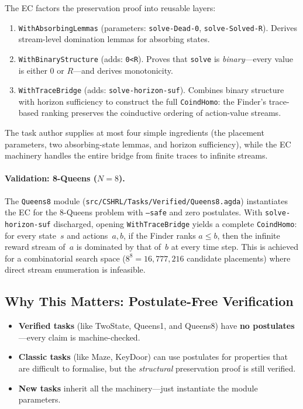 \documentclass[9pt,a4paper]{article}
\newcommand{\fpath}[1]{\nolinkurl{#1}}
\theoremstyle{plain}
\theoremstyle{definition}
\theoremstyle{remark}
\begin{document}
The EC factors the preservation proof into reusable layers:

\begin{enumerate}
\item \texttt{WithAbsorbingLemmas} (parameters: \texttt{solve-Dead-0}, \texttt{solve-Solved-R}).  Derives stream-level domination lemmas for absorbing states.

\item \texttt{WithBinaryStructure} (adds: \texttt{0\textless{}R}).  Proves that \texttt{solve} is \emph{binary}---every value is either $0$ or $R$---and derives monotonicity.

\item \texttt{WithTraceBridge} (adds: \texttt{solve-horizon-suf}).  Combines binary structure with horizon sufficiency to construct the full \texttt{CoindHomo}: the Finder's trace-based ranking preserves the coinductive ordering of action-value streams.
\end{enumerate}

\noindent The task author supplies at most four simple ingredients (the placement parameters, two absorbing-state lemmas, and horizon sufficiency), while the EC machinery handles the entire bridge from finite traces to infinite streams.

\paragraph{Validation: 8-Queens ($N = 8$).}
The \texttt{Queens8} module (\fpath{src/CSHRL/Tasks/Verified/Queens8.agda}) instantiates the EC for the $8$-Queens problem with \texttt{--safe} and zero postulates.  With \texttt{solve-horizon-suf} discharged, opening \texttt{WithTraceBridge} yields a complete \texttt{CoindHomo}: for every state~$s$ and actions~$a, b$, if the Finder ranks $a \le b$, then the infinite reward stream of~$a$ is dominated by that of~$b$ at every time step.  This is achieved for a combinatorial search space ($8^8 = 16{,}777{,}216$ candidate placements) where direct stream enumeration is infeasible.

\subsection{Why This Matters: Postulate-Free Verification}

\begin{itemize}
\item \textbf{Verified tasks} (like TwoState, Queens1, and Queens8) have \textbf{no postulates}---every claim is machine-checked.
\item \textbf{Classic tasks} (like Maze, KeyDoor) can use postulates for properties that are difficult to formalise, but the \emph{structural} preservation proof is still verified.
\item \textbf{New tasks} inherit all the machinery---just instantiate the module parameters.
\end{itemize}
\end{document}
